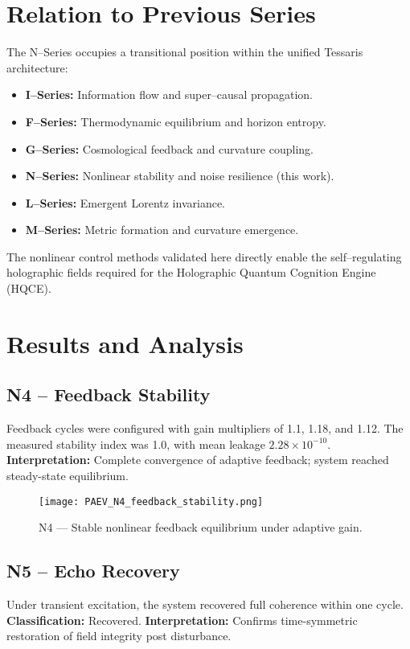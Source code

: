 \documentclass[11pt,a4paper]{article}
\begin{document}
\section{Relation to Previous Series}
The N--Series occupies a transitional position within the unified Tessaris architecture:
\begin{itemize}
\item \textbf{I--Series:} Information flow and super--causal propagation.
\item \textbf{F--Series:} Thermodynamic equilibrium and horizon entropy.
\item \textbf{G--Series:} Cosmological feedback and curvature coupling.
\item \textbf{N--Series:} Nonlinear stability and noise resilience (this work).
\item \textbf{L--Series:} Emergent Lorentz invariance.
\item \textbf{M--Series:} Metric formation and curvature emergence.
\end{itemize}
The nonlinear control methods validated here directly enable the self--regulating holographic fields required for the Holographic Quantum Cognition Engine (HQCE).

\section{Results and Analysis}

\subsection{N4 -- Feedback Stability}
Feedback cycles were configured with gain multipliers of 1.1, 1.18, and 1.12.
The measured stability index was 1.0, with mean leakage \(2.28\times10^{-10}\).
\textbf{Interpretation:} Complete convergence of adaptive feedback; system reached steady-state equilibrium.

\begin{figure}[h]
\centering
\texttt{[image: PAEV\_N4\_feedback\_stability.png]}
\caption{N4 --- Stable nonlinear feedback equilibrium under adaptive gain.}
\end{figure}

\subsection{N5 -- Echo Recovery}
Under transient excitation, the system recovered full coherence within one cycle.
\textbf{Classification:} Recovered.
\textbf{Interpretation:} Confirms time-symmetric restoration of field integrity post disturbance.
\end{document}
